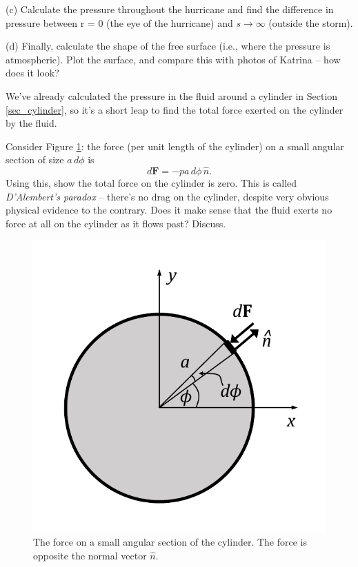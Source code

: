 \begin{problem}
(c) Calculate the pressure throughout the hurricane and find the difference in pressure between r = 0 (the eye of the hurricane) and $s \to \infty$ (outside the storm).

(d) Finally, calculate the shape of the free surface (i.e., where the pressure is atmospheric). Plot the surface, and compare this with photos of Katrina -- how does it look?



\end{problem}



\begin{problem}
\label{prob_force1}
We've already calculated the pressure in the fluid around a cylinder in Section \ref{sec_cylinder}, so it's a short leap to find the total force exerted on the cylinder by the fluid.

Consider Figure \ref{fig_cylinder_force}:  the force (per unit length of the cylinder) on a small angular section of size $a \, d\phi$ is
\[
d\textbf{F} = - p a \, d\phi \, \hat{n}.
\]
Using this, show the total force on the cylinder is zero.  This is called \emph{D'Alembert's paradox} -- there's no drag on the cylinder, despite very obvious physical evidence to the contrary.  Does it make sense that the fluid exerts no force at all on the cylinder as it flows past?  Discuss.

\begin{figure}[t]
\centering\includegraphics[width=0.5\linewidth]{Figures/Chapter3/fig_cyl_force}
\caption{The force on a small angular section of the cylinder.  The force is opposite the normal vector $\hat{n}$.}
\label{fig_cylinder_force}
\end{figure}
\end{problem}


